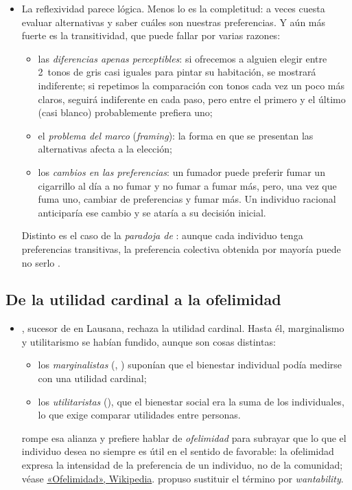 \documentclass[11pt]{article}
\begin{document}
\begin{itemize}
\item La reflexividad parece lógica. Menos lo es la completitud: a veces cuesta evaluar alternativas y saber cuáles son nuestras preferencias. Y aún más fuerte es la transitividad, que puede fallar por varias razones:
  \begin{itemize}
  \item las \emph{diferencias apenas perceptibles}: si ofrecemos a alguien elegir entre 2~tonos de gris casi iguales para pintar su habitación, se mostrará indiferente; si repetimos la comparación con tonos cada vez un poco más claros, seguirá indiferente en cada paso, pero entre el primero y el último (casi blanco) probablemente prefiera uno;
  \item el \emph{problema del marco} (\emph{framing}): la forma en que se presentan las alternativas afecta a la elección\nocite{TverskyKahneman1981Framing,KahnemanTversky1984Choices};
  \item los \emph{cambios en las preferencias}: un fumador puede preferir fumar un cigarrillo al día a no fumar y no fumar a fumar más, pero, una vez que fuma uno, cambiar de preferencias y fumar más. Un individuo racional anticiparía ese cambio y se ataría a su decisión inicial.
  \end{itemize}
  Distinto es el caso de la \emph{paradoja de }: aunque cada individuo tenga preferencias transitivas, la preferencia colectiva obtenida por mayoría puede no serlo .
\end{itemize}

\subsection{De la utilidad cardinal a la ofelimidad}\label{anexo:ofelimidad}

\begin{itemize}
\item {}, sucesor de  en Lausana, rechaza la utilidad cardinal. Hasta él, marginalismo y utilitarismo se habían fundido, aunque son cosas distintas:
\begin{itemize}
\item los \emph{marginalistas} (, ) suponían que el bienestar individual podía medirse con una utilidad cardinal;
\item los \emph{utilitaristas} (), que el bienestar social era la suma de los individuales, lo que exige comparar utilidades entre personas.
\end{itemize}
 rompe esa alianza y prefiere hablar de \emph{ofelimidad} para subrayar que lo que el individuo desea no siempre es útil en el sentido de favorable: la ofelimidad expresa la intensidad de la preferencia de un individuo, no de la comunidad\nocite{Pareto1896Cours}; véase \href{https://es.wikipedia.org/wiki/Ofelimidad}{«Ofelimidad», Wikipedia}. \textcite{Fisher1918Utility} propuso sustituir el término por \emph{wantability}.
\end{itemize}
\end{document}
